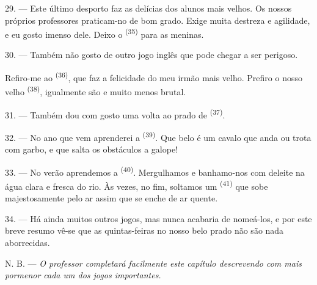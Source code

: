29. --- Este último desporto faz as delícias dos alunos mais velhos. Os
nossos próprios professores praticam-no de bom grado. Exige muita
destreza e agilidade, e eu gosto imenso dele. Deixo o 
\textsuperscript{(35)} para as meninas.

30. --- Também não gosto de outro jogo inglês que pode chegar a ser
perigoso.

Refiro-me ao  \textsuperscript{(36)}, que faz a felicidade do meu
irmão mais velho. Prefiro o nosso velho 
\textsuperscript{(38)}, igualmente são e muito menos brutal.

\VUsaut{4.6mm}
\VUsaut{3.0mm}

31. --- Também dou com gosto uma volta ao prado de 
\textsuperscript{(37)}.

32. --- No ano que vem aprenderei a 
\textsuperscript{(39)}. Que belo é um cavalo que anda ou trota com garbo, e
que salta os obstáculos a galope!

33. --- No verão aprendemos a  \textsuperscript{(40)}. Mergulhamos e
banhamo-nos com deleite na água clara e fresca do rio. Às vezes, no fim,
soltamos um  \textsuperscript{(41)} que sobe
majestosamente pelo ar assim que se enche de ar quente.

34. --- Há ainda muitos outros jogos, mas nunca acabaria de nomeá-los, e
por este breve resumo vê-se que as quintas-feiras no nosso belo prado não
são nada aborrecidas.

N. B. --- \textit{O professor completará facilmente este capítulo
descrevendo com mais pormenor cada um dos jogos importantes.}
\VUsaut{6.0mm}
\VUfilet{22mm}
